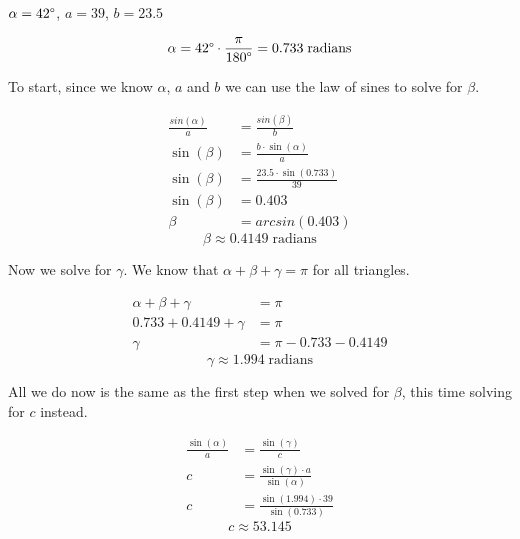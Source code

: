 \begin{problem}[11.]
    $\alpha = 42\degree$, $a = 39$, $b = 23.5$
\end{problem}

\begin{solution}
    \[\alpha = 42\degree \cdot \frac{\pi}{180\degree} = 0.733 \; \text{radians}\]
    
    To start, since we know $\alpha$, $a$ and $b$ we can use the law of sines to solve for $\beta$. 
    
    \begin{align}
        \frac{sin(\alpha)}{a} &= \frac{sin(\beta)}{b} \\
        \sin(\beta) &= \frac{b \cdot \sin(\alpha)}{a} \\
        \sin(\beta) &= \frac{23.5 \cdot \sin(0.733)}{39} \\
        \sin(\beta) &= 0.403 \\
        \beta &= arcsin(0.403)
    \end{align}
    \[\boxed{ \beta \approx 0.4149 \; \text{radians}  }\]
    
    Now we solve for $\gamma$. We know that $\alpha + \beta + \gamma = \pi$ for all triangles. 
    
    \begin{align}
        \alpha + \beta + \gamma &= \pi \\
        0.733 + 0.4149 + \gamma &= \pi \\
        \gamma &= \pi - 0.733 - 0.4149
    \end{align}
    \[\boxed{  \gamma \approx 1.994 \; \text{radians}  }\]
    
    All we do now is the same as the first step when we solved for $\beta$, this time solving for $c$ instead. 
    
    \begin{align}
        \frac{\sin(\alpha)}{a} &= \frac{\sin(\gamma)}{c} \\
        c &= \frac{\sin(\gamma) \cdot a}{\sin(\alpha)} \\
        c &= \frac{\sin(1.994) \cdot 39}{\sin(0.733)}
    \end{align}
    \[\boxed{ c \approx 53.145  }\]
\end{solution}